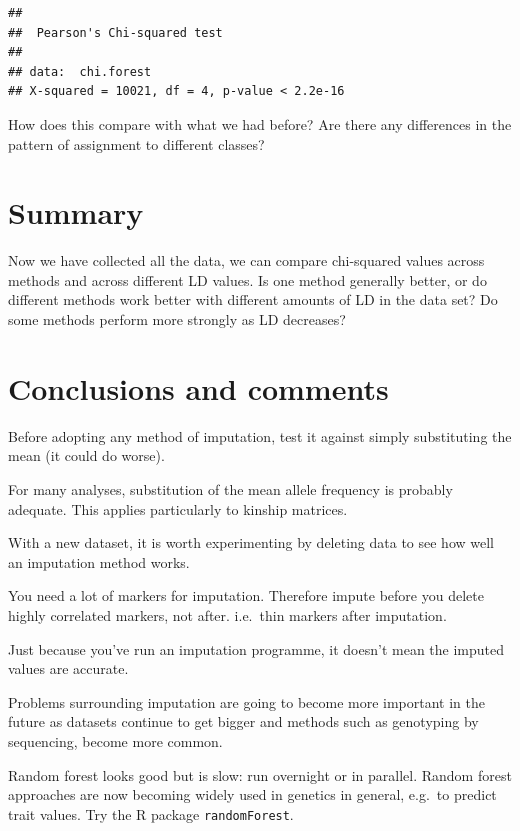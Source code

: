 \documentclass[
]{book}
\makeatletter
\newenvironment{kframe}{%
\medskip{}
\setlength{\fboxsep}{.8em}
 \def\at@end@of@kframe{}%
 \ifinner\ifhmode%
  \def\at@end@of@kframe{\end{minipage}}%
  \begin{minipage}{\columnwidth}%
 \fi\fi%
 \def\FrameCommand##1{\hskip\@totalleftmargin \hskip-\fboxsep
 \colorbox{shadecolor}{##1}\hskip-\fboxsep
     \hskip-\linewidth \hskip-\@totalleftmargin \hskip\columnwidth}%
 \MakeFramed {\advance\hsize-\width
   \@totalleftmargin\z@ \linewidth\hsize
   \@setminipage}}%
 {\par\unskip\endMakeFramed%
 \at@end@of@kframe}
\newenvironment{rmdblock}[1]
  {
  \begin{itemize}
  \renewcommand{\labelitemi}{
    \raisebox{-.7\height}[0pt][0pt]{
      {\setkeys{Gin}{width=3em,keepaspectratio}\texttt{[image: images/\#1]}}
    }
  }
  \setlength{\fboxsep}{1em}
  \begin{kframe}
  \item
  }
  {
  \end{kframe}
  \end{itemize}
  }
\newenvironment{rmdquiz}
  {\begin{rmdblock}{quiz}}
  {\end{rmdblock}}
\makeatother
\begin{document}
\begin{verbatim}
## 
##  Pearson's Chi-squared test
## 
## data:  chi.forest
## X-squared = 10021, df = 4, p-value < 2.2e-16
\end{verbatim}

How does this compare with what we had before? Are there any differences in the pattern of assignment to different classes?

\hypertarget{summary-1}{%
\section{Summary}\label{summary-1}}

\begin{rmdquiz}
Now we have collected all the data, we can compare chi-squared values across methods and across different LD values. Is one method generally better, or do different methods work better with different amounts of LD in the data set? Do some methods perform more strongly as LD decreases?
\end{rmdquiz}

\hypertarget{conclusions-and-comments}{%
\section{Conclusions and comments}\label{conclusions-and-comments}}

Before adopting any method of imputation, test it against simply substituting the mean (it could do worse).

For many analyses, substitution of the mean allele frequency is probably adequate. This applies particularly to kinship matrices.

With a new dataset, it is worth experimenting by deleting data to see how well an imputation method works.

You need a lot of markers for imputation. Therefore impute before you delete highly correlated markers, not after. i.e.~thin markers after imputation.

Just because you've run an imputation programme, it doesn't mean the imputed values are accurate.

Problems surrounding imputation are going to become more important in the future as datasets continue to get bigger and methods such as genotyping by sequencing, become more common.

Random forest looks good but is slow: run overnight or in parallel. Random forest approaches are now becoming widely used in genetics in general, e.g.~to predict trait values. Try the R package \texttt{randomForest}.
\end{document}
